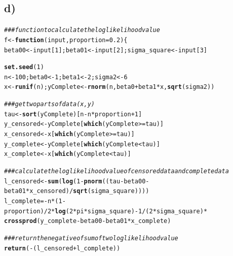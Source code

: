 \documentclass{article}\usepackage[]{graphicx}\usepackage[]{color}
\makeatletter
\newcommand{\hlnum}[1]{\textcolor[rgb]{0.686,0.059,0.569}{#1}}%
\newcommand{\hlcom}[1]{\textcolor[rgb]{0.678,0.584,0.686}{\textit{#1}}}%
\newcommand{\hlopt}[1]{\textcolor[rgb]{0,0,0}{#1}}%
\newcommand{\hlstd}[1]{\textcolor[rgb]{0.345,0.345,0.345}{#1}}%
\newcommand{\hlkwa}[1]{\textcolor[rgb]{0.161,0.373,0.58}{\textbf{#1}}}%
\newcommand{\hlkwb}[1]{\textcolor[rgb]{0.69,0.353,0.396}{#1}}%
\newcommand{\hlkwc}[1]{\textcolor[rgb]{0.333,0.667,0.333}{#1}}%
\newcommand{\hlkwd}[1]{\textcolor[rgb]{0.737,0.353,0.396}{\textbf{#1}}}%
\newenvironment{kframe}{%
 \def\at@end@of@kframe{}%
 \ifinner\ifhmode%
  \def\at@end@of@kframe{\end{minipage}}%
  \begin{minipage}{\columnwidth}%
 \fi\fi%
 \def\FrameCommand##1{\hskip\@totalleftmargin \hskip-\fboxsep
 \colorbox{shadecolor}{##1}\hskip-\fboxsep
     \hskip-\linewidth \hskip-\@totalleftmargin \hskip\columnwidth}%
 \MakeFramed {\advance\hsize-\width
   \@totalleftmargin\z@ \linewidth\hsize
   \@setminipage}}%
 {\par\unskip\endMakeFramed%
 \at@end@of@kframe}
\newenvironment{knitrout}{}{} %
\makeatother
\begin{document}
\subsection{d)}
\begin{knitrout}
\color{fgcolor}\begin{kframe}
\begin{alltt}
\hlcom{###function to calculate the log likelihood value}
\hlstd{f}\hlkwb{<-}\hlkwa{function}\hlstd{(}\hlkwc{input}\hlstd{,}\hlkwc{proportion}\hlstd{=}\hlnum{0.2}\hlstd{)\{}
  \hlstd{beta00}\hlkwb{<-}\hlstd{input[}\hlnum{1}\hlstd{];beta01}\hlkwb{<-}\hlstd{input[}\hlnum{2}\hlstd{];sigma_square}\hlkwb{<-}\hlstd{input[}\hlnum{3}\hlstd{]}

  \hlkwd{set.seed}\hlstd{(}\hlnum{1}\hlstd{)}
  \hlstd{n} \hlkwb{<-} \hlnum{100}\hlstd{; beta0} \hlkwb{<-} \hlnum{1}\hlstd{; beta1} \hlkwb{<-} \hlnum{2}\hlstd{; sigma2} \hlkwb{<-} \hlnum{6}
  \hlstd{x} \hlkwb{<-} \hlkwd{runif}\hlstd{(n); yComplete} \hlkwb{<-} \hlkwd{rnorm}\hlstd{(n, beta0} \hlopt{+} \hlstd{beta1}\hlopt{*}\hlstd{x,} \hlkwd{sqrt}\hlstd{(sigma2))}

  \hlcom{###get two parts of data(x,y)}
  \hlstd{tau}\hlkwb{<-}\hlkwd{sort}\hlstd{(yComplete)[n}\hlopt{-}\hlstd{n}\hlopt{*}\hlstd{proportion}\hlopt{+}\hlnum{1}\hlstd{]}
  \hlstd{y_censored}\hlkwb{<-}\hlstd{yComplete[}\hlkwd{which}\hlstd{(yComplete}\hlopt{>=}\hlstd{tau)]}
  \hlstd{x_censored}\hlkwb{<-}\hlstd{x[}\hlkwd{which}\hlstd{(yComplete}\hlopt{>=}\hlstd{tau)]}
  \hlstd{y_complete}\hlkwb{<-}\hlstd{yComplete[}\hlkwd{which}\hlstd{(yComplete}\hlopt{<}\hlstd{tau)]}
  \hlstd{x_complete}\hlkwb{<-}\hlstd{x[}\hlkwd{which}\hlstd{(yComplete}\hlopt{<}\hlstd{tau)]}

  \hlcom{###calculate the log likelihood value of censored data and complete data}
  \hlstd{l_censored}\hlkwb{<-}\hlkwd{sum}\hlstd{(}\hlkwd{log}\hlstd{(}\hlnum{1}\hlopt{-}\hlkwd{pnorm}\hlstd{((tau}\hlopt{-}\hlstd{beta00}\hlopt{-}\hlstd{beta01}\hlopt{*}\hlstd{x_censored)}\hlopt{/}\hlkwd{sqrt}\hlstd{(sigma_square))))}
  \hlstd{l_complete}\hlkwb{=}\hlopt{-}\hlstd{n}\hlopt{*}\hlstd{(}\hlnum{1}\hlopt{-}\hlstd{proportion)}\hlopt{/}\hlnum{2}\hlopt{*}\hlkwd{log}\hlstd{(}\hlnum{2}\hlopt{*}\hlstd{pi}\hlopt{*}\hlstd{sigma_square)}\hlopt{-}\hlnum{1}\hlopt{/}\hlstd{(}\hlnum{2}\hlopt{*}\hlstd{sigma_square)}\hlopt{*}
  \hlkwd{crossprod}\hlstd{(y_complete}\hlopt{-}\hlstd{beta00}\hlopt{-}\hlstd{beta01}\hlopt{*}\hlstd{x_complete)}

  \hlcom{###return the negative of sum of two log likelihood value}
  \hlkwd{return}\hlstd{(}\hlopt{-}\hlstd{(l_censored}\hlopt{+}\hlstd{l_complete))}


\end{alltt}
\end{kframe}
\end{knitrout}
\end{document}
